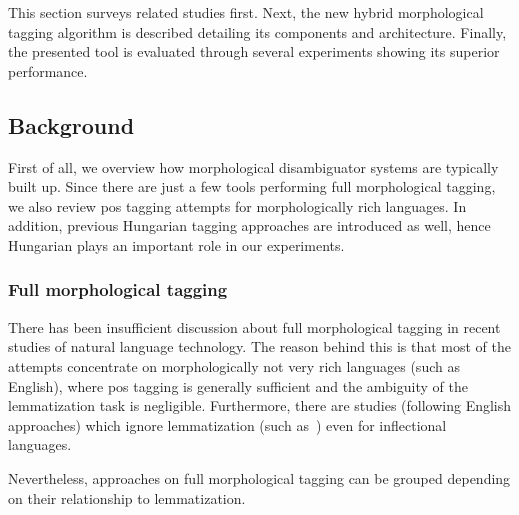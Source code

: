This section surveys related studies first. 
Next, the new hybrid morphological tagging algorithm is described detailing its components and architecture. 
Finally, the presented tool is evaluated through several experiments showing its superior performance.

\subsection{Background}

First of all, we overview how morphological disambiguator systems are typically built up. 
Since there are just a few tools performing full morphological tagging, we also review \gls{pos} tagging attempts for morphologically rich languages. 
In addition, previous Hungarian tagging approaches are introduced as well, hence Hungarian plays an important role in our experiments.

\subsubsection{Full morphological tagging}

There has been insufficient discussion about full morphological tagging in recent studies of natural language technology. 
The reason behind this is that most of the attempts concentrate on morphologically not very rich languages (such as English), where \gls{pos} tagging is generally sufficient and the ambiguity of the lemmatization task is negligible. 
Furthermore, there are studies (following English approaches) which ignore lemmatization (such as~\cite{Hajic1998a,Tufis1998,Silfverberg2011}) even for inflectional languages. 

Nevertheless, approaches on full morphological tagging can be grouped depending on their relationship to lemmatization.

